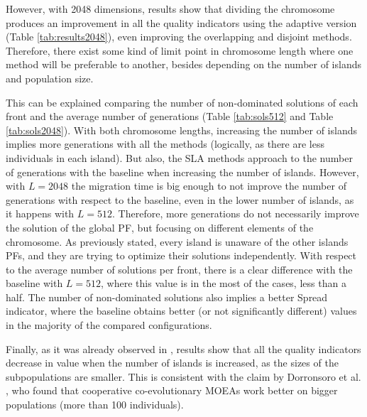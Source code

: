 \documentclass[preprint]{elsarticle}
\begin{document}
However, with 2048 dimensions, results show that dividing the chromosome produces an improvement in all the quality indicators using the adaptive version (Table \ref{tab:results2048}), even improving the overlapping and disjoint methods. Therefore, there exist some kind of limit point in chromosome length where one method will be preferable to another, besides depending on the number of islands and population size.


This can be explained comparing the number of non-dominated solutions
of each front and the average number of generations (Table
\ref{tab:sols512} and Table \ref{tab:sols2048}). With both chromosome
lengths, increasing the number of islands implies more generations
with all the methods (logically, as there are less individuals in each
island). But also, the SLA methods
approach to the number of generations with the baseline when
increasing the number of islands. However, with $L=2048$ the migration
time is big enough  to not improve the number of generations
with respect to the baseline, even in the lower number of islands, as
it happens with $L=512$. Therefore, more generations do not
necessarily improve the solution of the global PF, but focusing on
different elements of the chromosome. As  previously stated, every
island is unaware of the other islands PFs, and they are trying to
optimize their solutions independently. With respect to the average
number of solutions per front, there is a clear difference 
 with the baseline with $L=512$, where this value is in the most
of the cases, less than a half. The number of non-dominated solutions
also implies a better Spread indicator, where the baseline 
 obtains better (or not significantly different) values in the majority of the compared configurations. %

Finally, as it was already observed in \citep{Garcia16hpmoon}, results
show that all the quality indicators decrease in value when the number of islands is increased, as the  sizes of the subpopulations are smaller. This is consistent with the claim by Dorronsoro et al. \citep{Dorronsoro13superlinear}, who found that cooperative co-evolutionary MOEAs work better on bigger populations (more than 100 individuals).


\end{document}
